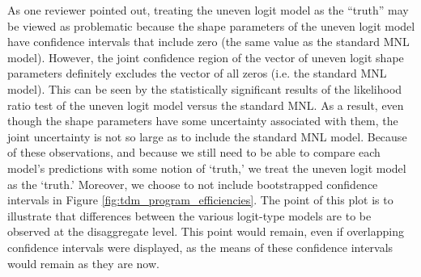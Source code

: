 As one reviewer pointed out, treating the uneven logit model as the ``truth'' may be viewed as problematic because the shape parameters of the uneven logit model have confidence intervals that include zero (the same value as the standard MNL model). However, the joint confidence region of the vector of uneven logit shape parameters definitely excludes the vector of all zeros (i.e. the standard MNL model). This can be seen by the statistically significant results of the likelihood ratio test of the uneven logit model versus the standard MNL. As a result, even though the shape parameters have some uncertainty associated with them, the joint uncertainty is not so large as to include the standard MNL model. Because of these observations, and because we still need to be able to compare each model's predictions with some notion of `truth,' we treat the uneven logit model as the `truth.' Moreover, we choose to not include bootstrapped confidence intervals in Figure \ref{fig:tdm_program_efficiencies}. The point of this plot is to illustrate that differences between the various logit-type models are to be observed at the disaggregate level. This point would remain, even if overlapping confidence intervals were displayed, as the means of these confidence intervals would remain as they are now.

\newpage
\renewcommand\bibname{{References}} %


